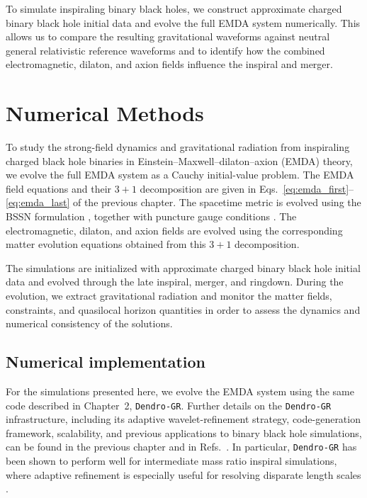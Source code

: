 To simulate inspiraling binary black holes, we construct approximate charged binary black hole initial data and evolve the full EMDA system numerically. This allows us to compare the resulting gravitational waveforms against neutral general relativistic reference waveforms and to identify how the combined electromagnetic, dilaton, and axion fields influence the inspiral and merger.

\section{Numerical Methods}
\label{sec:methods}

To study the strong-field dynamics and gravitational radiation from inspiraling charged black hole binaries in Einstein--Maxwell--dilaton--axion (EMDA) theory, we evolve the full EMDA system as a Cauchy initial-value problem. The EMDA field equations and their $3+1$ decomposition are given in Eqs.~\ref{eq:emda_first}--\ref{eq:emda_last} of the previous chapter. The spacetime metric is evolved using the BSSN formulation \cite{Shibata1995_BSSN,Baumgarte1999_BSSN,Baumgarte2010}, together with puncture gauge conditions \cite{Campanelli2006,Baker2006}. The electromagnetic, dilaton, and axion fields are evolved using the corresponding matter evolution equations obtained from this $3+1$ decomposition.

The simulations are initialized with approximate charged binary black hole initial data and evolved through the late inspiral, merger, and ringdown. During the evolution, we extract gravitational radiation and monitor the matter fields, constraints, and quasilocal horizon quantities in order to assess the dynamics and numerical consistency of the solutions.

\subsection{Numerical implementation}
\label{sec:code_description}

For the simulations presented here, we evolve the EMDA system using the same code described in Chapter~2, \texttt{Dendro-GR}. Further details on the \texttt{Dendro-GR} infrastructure, including its adaptive wavelet-refinement strategy, code-generation framework, scalability, and previous applications to binary black hole simulations, can be found in the previous chapter and in Refs.~\cite{Fernando2019,Fernando2019b,Fernando2023,Black2025_ORBIT}. In particular, \texttt{Dendro-GR} has been shown to perform well for intermediate mass ratio inspiral simulations, where adaptive refinement is especially useful for resolving disparate length scales \cite{Fernando2019b,Black2025_ORBIT}.


